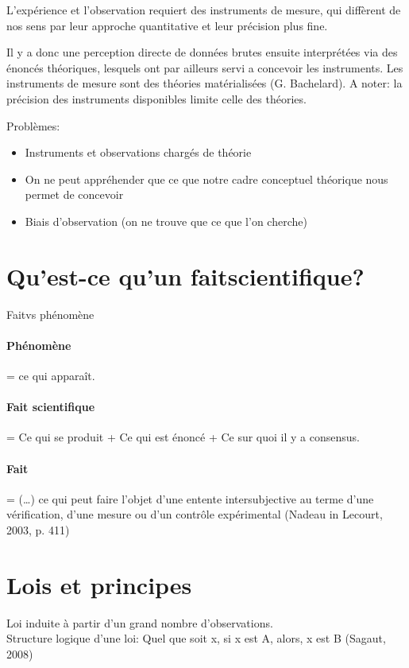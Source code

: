 \documentclass{report}
\begin{document}
	L'expérience et l'observation requiert des instruments de mesure, qui diffèrent de nos sens par leur approche quantitative et leur précision plus fine.
	
	Il y a donc une perception directe de données brutes ensuite interprétées via des énoncés théoriques, lesquels ont par ailleurs servi a concevoir les instruments. Les instruments de mesure sont des \og théories matérialisées \fg (G. Bachelard). A noter: la précision des instruments disponibles limite celle des théories.
	
	Problèmes:
	\begin{itemize}
		\item Instruments et observations chargés de théorie
		\item On ne peut appréhender que ce que notre cadre conceptuel théorique nous permet de concevoir
		\item Biais d’observation (on ne trouve que ce que l’on cherche)
	\end{itemize}
	
	\section{Qu'est-ce qu'un \og fait\fg scientifique?}
	
	\og Fait\fg vs phénomène
	\paragraph{Phénomène} = ce qui apparaît.
	\paragraph{Fait scientifique} = Ce qui \og se produit \fg + Ce qui est énoncé + Ce sur quoi il y a consensus.
	
	\paragraph{Fait} = \og (…) ce qui peut faire l’objet d’une entente intersubjective au terme d’une vérification, d’une mesure ou d’un contrôle expérimental \fg (Nadeau in Lecourt, 2003, p. 411)
	
	\section{Lois et principes}
	
	Loi induite à partir d’un grand nombre d’observations.\\
	Structure logique d’une loi: Quel que soit x, si x est A, alors, x est B (Sagaut, 2008)
	
\end{document}
